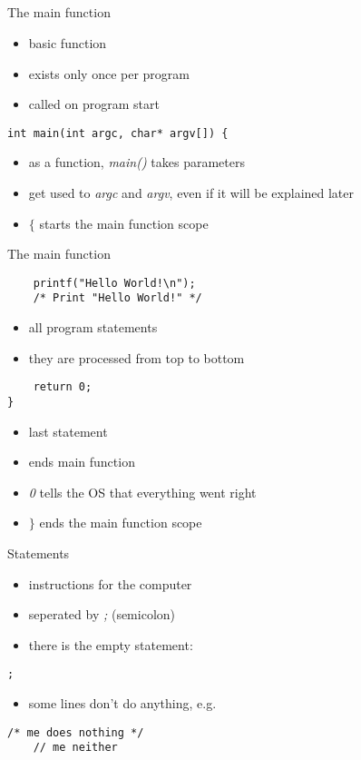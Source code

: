 \subsection{}
\begin{frame}[fragile]{The main function}
	\begin{itemize}
		\item basic function
		\item exists only once per program
		\item called on program start
	\end{itemize}
	\begin{lstlisting}
int main(int argc, char* argv[]) {
\end{lstlisting}
	\begin{itemize}
		\item as a function, \textit{main()} takes parameters
		\item get used to \textit{argc} and \textit{argv}, even if it will be explained later
		\item $\lbrace$ starts the main function scope
	\end{itemize}
\end{frame}
\begin{frame}[fragile]{The main function}
	\begin{lstlisting}
	printf("Hello World!\n");
	/* Print "Hello World!" */
\end{lstlisting}
	\begin{itemize}
		\item all program statements
		\item they are processed from top to bottom
	\end{itemize}
	\begin{lstlisting}
	return 0;
}
\end{lstlisting}
	\begin{itemize}
		\item last statement
		\item ends main function
		\item \textit{0} tells the OS that everything went right
		\item $\rbrace$ ends the main function scope
	\end{itemize}
\end{frame}
\begin{frame}[fragile]{Statements}
	\begin{itemize}
		\item instructions for the computer
		\item seperated by \textit{;} (semicolon)
		\item there is the empty statement:
	\end{itemize}
	\begin{lstlisting}[numbers=none]
	;
\end{lstlisting}
	\begin{itemize}
		\item some lines don't do anything, e.g.
	\end{itemize}
	\begin{lstlisting}[numbers=none]
	/* me does nothing */
	// me neither
\end{lstlisting}
\end{frame}
